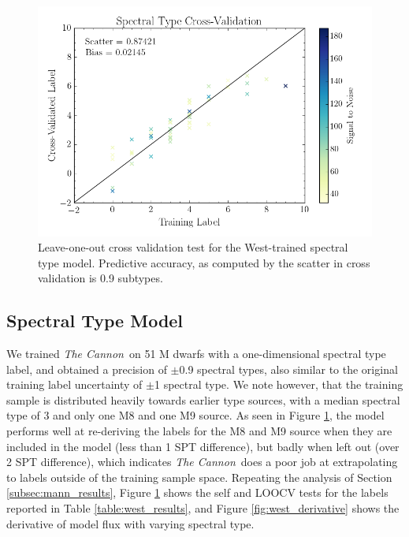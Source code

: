 \documentclass[twocolumn]{aastex62}
\newcommand{\thecannon}{\textsl{The Cannon}}
\begin{document}
\begin{figure}
	\begin{center}
	\includegraphics[width=\linewidth]{figures/crv_test_spt.png}
	\end{center}
	\caption{Leave-one-out cross validation test for the West-trained spectral type model. Predictive accuracy, as computed by the scatter in cross validation is 0.9 subtypes.}
	\label{fig:west_validation}
\end{figure}

\subsection{Spectral Type Model \label{subsec:west_results}}

We trained \thecannon\ on 51 M dwarfs with a one-dimensional spectral type label, and obtained a precision of $\pm$0.9 spectral types, also similar to the original training label uncertainty of $\pm$1 spectral type. We note however, that the training sample is distributed heavily towards earlier type sources, with a median spectral type of 3 and only one M8 and one M9 source. As seen in Figure \ref{fig:west_validation}, the model performs well at re-deriving the labels for the M8 and M9 source when they are included in the model (less than 1 SPT difference), but badly when left out (over 2 SPT difference), which indicates \thecannon\ does a poor job at extrapolating to labels outside of the training sample space. Repeating the analysis of Section \ref{subsec:mann_results}, Figure \ref{fig:west_validation} shows the self and LOOCV tests for the labels reported in Table \ref{table:west_results}, and Figure \ref{fig:west_derivative} shows the derivative of model flux with varying spectral type.
\end{document}
